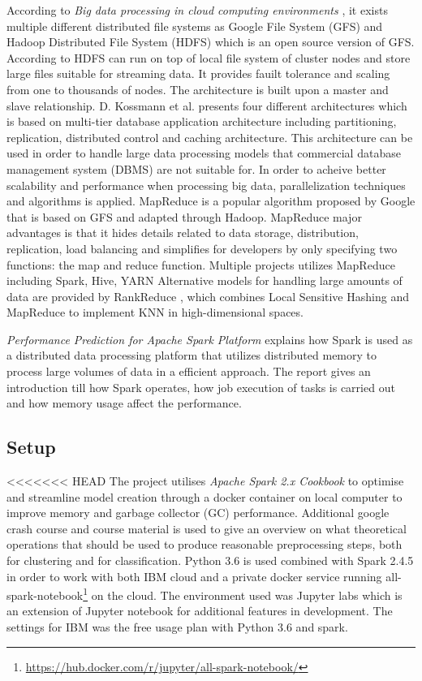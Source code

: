 \documentclass[../main.tex]{subfiles}
\begin{document}
According to \textit{Big data processing in cloud computing environments} \cite{ji2012big}, it exists multiple different distributed file systems as Google File System (GFS) and Hadoop Distributed File System (HDFS) which is an open source version of GFS. According to \cite{hashem2015rise} HDFS can run on top of local file system of cluster nodes and store large files suitable for streaming data. It provides fauilt tolerance and scaling from one to thousands of nodes. The architecture is built upon a master and slave relationship.  D. Kossmann et al.\cite{kossmann2010evaluation} presents four different architectures which is based on multi-tier database application architecture including partitioning, replication, distributed control and caching architecture. This architecture can be used in order to handle large data processing models that commercial database management system (DBMS) are not suitable for.
In order to acheive better scalability and performance when processing big data, parallelization techniques and algorithms is applied. MapReduce is a popular algorithm proposed by Google that is based on GFS and adapted through Hadoop. MapReduce major advantages is that it hides details related to data storage, distribution, replication, load balancing and simplifies for developers by only specifying two functions: the map and reduce function. Multiple projects utilizes MapReduce including Spark\cite{zaharia2010spark}, Hive\cite{thusoo2009hive}, YARN\cite{ekanayake2010twister} Alternative models for handling large amounts of data are provided by RankReduce \cite{stupar2010rankreduce}, which combines Local Sensitive Hashing and MapReduce to implement KNN in high-dimensional spaces.

\textit{Performance Prediction for Apache Spark Platform} \cite{wang2015performance} explains how Spark is used as a distributed data processing platform that utilizes distributed memory to process large volumes of data in a efficient approach. The report gives an introduction till how Spark operates, how job execution of tasks is carried out and how memory usage affect the performance.


\subsection{Setup}

<<<<<<< HEAD
The project utilises \textit{Apache Spark 2.x Cookbook} \cite{yadav2017apache} to optimise and streamline model creation through a docker container on local computer to improve memory and garbage collector (GC) performance. Additional google crash course and course material is used to give an overview on what theoretical operations that should be used to produce reasonable preprocessing steps, both for clustering and for classification. Python 3.6 is used combined with Spark 2.4.5 in order to work with both IBM cloud and a private docker service running all-spark-notebook\footnote{\url{https://hub.docker.com/r/jupyter/all-spark-notebook/}} on the cloud. The environment used was Jupyter labs which is an extension of Jupyter notebook for additional features in development. The settings for IBM was the free usage plan with Python 3.6 and spark. 
\end{document}
